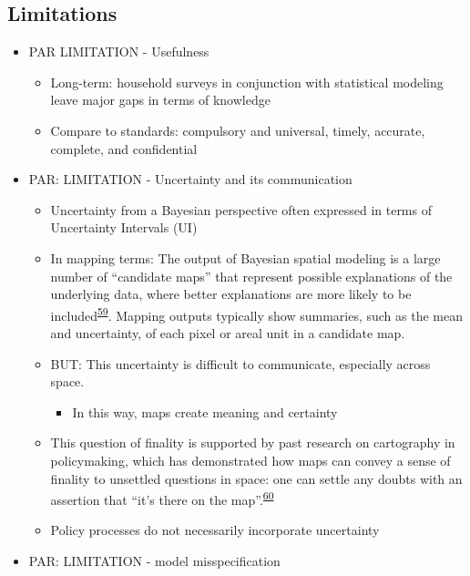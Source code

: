 \documentclass[
]{article}
\providecommand{\tightlist}{%
  \setlength{\itemsep}{0pt}\setlength{\parskip}{0pt}}
\begin{document}
\hypertarget{limitations}{%
\subsection{Limitations}\label{limitations}}

\begin{itemize}
\tightlist
\item
  PAR LIMITATION - Usefulness

  \begin{itemize}
  \tightlist
  \item
    Long-term: household surveys in conjunction with statistical modeling leave major
    gaps in terms of knowledge
  \item
    Compare to standards: compulsory and universal, timely, accurate, complete, and confidential
  \end{itemize}
\item
  PAR: LIMITATION - Uncertainty and its communication

  \begin{itemize}
  \tightlist
  \item
    Uncertainty from a Bayesian perspective often expressed in terms of Uncertainty
    Intervals (UI)
  \item
    In mapping terms: The output of Bayesian spatial modeling is a large number of ``candidate maps'' that represent possible explanations of the underlying data, where better explanations are more likely to be included\textsuperscript{\protect\hyperlink{ref-Patil2011}{59}}. Mapping outputs typically show summaries, such as the mean and uncertainty, of each pixel or areal unit in a candidate map.
  \item
    BUT: This uncertainty is difficult to communicate, especially across space.

    \begin{itemize}
    \tightlist
    \item
      In this way, maps create meaning and certainty
    \end{itemize}
  \item
    This question of finality is supported by past research on cartography in policymaking,
    which has demonstrated how maps can convey a sense of finality to unsettled questions
    in space: one can settle any doubts with an assertion that ``it's there on the map''.\textsuperscript{\protect\hyperlink{ref-Elwood2006}{60}}
  \item
    Policy processes do not necessarily incorporate uncertainty
  \end{itemize}
\item
  PAR: LIMITATION - model misspecification


\end{itemize}
\end{document}
